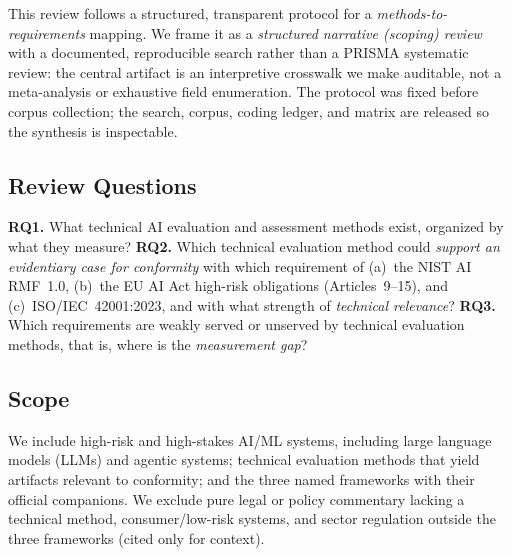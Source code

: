 This review follows a structured, transparent protocol for a \emph{methods-to-requirements}
mapping. We frame it as a \emph{structured narrative (scoping) review} with a documented,
reproducible search rather than a PRISMA systematic review: the central artifact is an
interpretive crosswalk we make auditable, not a meta-analysis or exhaustive field
enumeration. The protocol was fixed before corpus collection; the search, corpus, coding
ledger, and matrix are released so the synthesis is inspectable.

\subsection{Review Questions}
\textbf{RQ1.} What technical AI evaluation and assessment methods exist, organized by what
they measure? \textbf{RQ2.} Which technical evaluation method could \emph{support an
evidentiary case for conformity} with which requirement of (a)~the NIST AI RMF~1.0,
(b)~the EU AI Act high-risk obligations (Articles~9--15), and (c)~ISO/IEC~42001:2023, and
with what strength of \emph{technical relevance}? \textbf{RQ3.} Which requirements are
weakly served or unserved by technical evaluation methods, that is, where is the
\emph{measurement gap}?

\subsection{Scope}
We include high-risk and high-stakes AI/ML systems, including large language models (LLMs)
and agentic systems; technical evaluation methods that yield artifacts relevant to
conformity; and the three named frameworks with their official companions. We exclude pure
legal or policy commentary lacking a technical method, consumer/low-risk systems, and
sector regulation outside the three frameworks (cited only for context).

